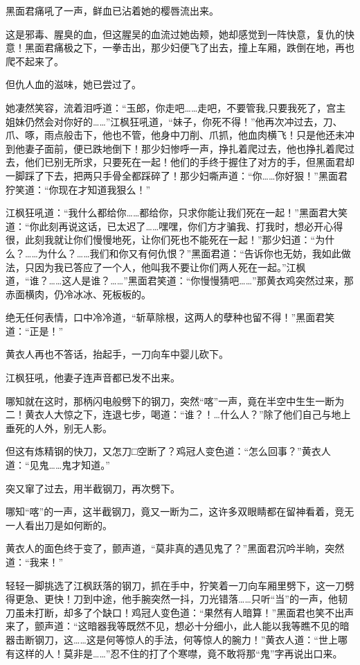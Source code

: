 \documentclass[12pt,oneside]{book}
\begin{document}
黑面君痛吼了一声，鲜血已沾着她的樱唇流出来。

这是邪毒、腥臭的血，但这腥吴的血流过她齿颊，她却感觉到一阵快意，复仇的快意！黑面君痛极之下，一拳击出，那少妇便飞了出去，撞上车厢，跌倒在地，再也爬不起来了。

但仇人血的滋味，她已尝过了。

她凄然笑容，流着泪呼道：``玉郎，你走吧\ldots\ldots 走吧，不要管我,只要我死了，宫主姐妹仍然会对你好的\ldots\ldots{}''江枫狂吼道，``妹子，你死不得！''他再次冲过去，刀、爪、啄，雨点般击下，他也不管，他身中刀削、爪抓，他血肉横飞！只是他还未冲到他妻子面前，便已跌地倒下！那少妇惨呼一声，挣扎着爬过去，他也挣扎着爬过去，他们已别无所求，只要死在一起！他们的手终于握住了对方的手，但黑面君却一脚踩了下去，把两只手骨全都踩碎了！那少妇嘶声道：``你\ldots\ldots 你好狠！''黑面君狞笑道：``你现在才知道我狠么！''

江枫狂吼道：``我什么都给你\ldots\ldots 都给你，只求你能让我们死在一起！''黑面君大笑道：``你此刻再说这话，已太迟了\ldots\ldots 嘿嘿，你们方才骗我、打我时，想必开心得很，此刻我就让你们慢慢地死，让你们死也不能死在一起！''那少妇道：``为什么？\ldots\ldots 为什么？\ldots\ldots 我们和你又有何仇恨？''黑面君道：``告诉你也无妨，我如此做法，只因为我已答应了一个人，他叫我不要让你们两人死在一起。''江枫道，``谁？\ldots\ldots 这人是谁？\ldots\ldots{}''黑面君笑道：``你慢慢猜吧\ldots\ldots{}''那黄衣鸡突然过来，那赤面横肉，仍冷冰冰、死板板的。

绝无任何表情，口中冷冷道，``斩草除根，这两人的孽种也留不得！''黑面君笑道：``正是！''

黄衣人再也不答话，抬起手，一刀向车中婴儿砍下。

江枫狂吼，他妻子连声音都已发不出来。

哪知就在这时，那柄闪电般劈下的钢刀，突然``喀''一声，竟在半空中生生一断为二！黄衣人大惊之下，连退七步，喝道：``谁？！\ldots 什么人？''除了他们自己与地上垂死的人外，别无人影。

但这有炼精钢的快刀，又怎刀□空断了？鸡冠人变色道：``怎么回事？''黄衣人道：``见鬼\ldots\ldots 鬼才知道。''

突又窜了过去，用半截钢刀，再次劈下。

哪知``喀''的一声，这半截钢刀，竟又一断为二，这许多双眼睛都在留神看着，竞无一人看出刀是如何断的。

黄衣人的面色终于变了，颤声道，``莫非真的遇见鬼了？''黑面君沉吟半晌，突然道：``我来！''

轻轻一脚挑选了江枫跃落的钢刀，抓在手中，狞笑着一刀向车厢里劈下，这一刀劈得更急、更快！刀到中途，他手腕突然一抖，刀光错落\ldots\ldots 只听``当''的一声，他韧刀虽未打断，却多了个缺口！鸡冠人变色道：``果然有人暗算！''黑面君也笑不出声来了，颤声道：``这暗器我等既然不见，想必十分细小，此人能以我等瞧不见的暗器击断钢刀，这\ldots\ldots 这是何等惊人的手法，何等惊人的腕力！''黄衣人道：``世上哪有这样的人！莫非是\ldots\ldots{}''忍不住的打了个寒噤，竟不敢将那``鬼''字再说出口来。
\end{document}
